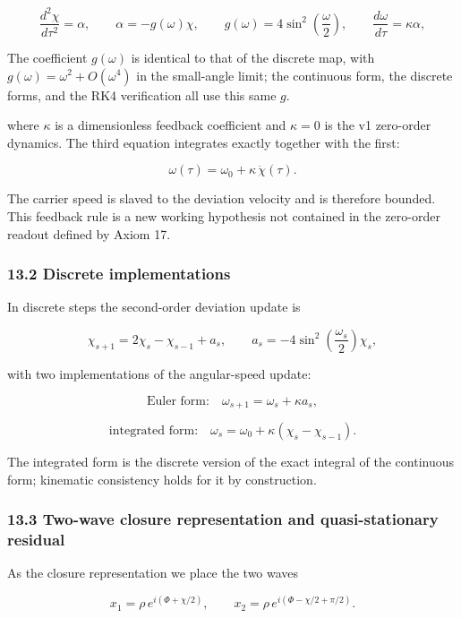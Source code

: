\documentclass[
  a4paper,
]{article}
\begin{document}
\[
\frac{d^2\chi}{d\tau^2}=\alpha,
\qquad
\alpha=-g(\omega)\chi,
\qquad
g(\omega)=4\sin^2\!\left(\frac{\omega}{2}\right),
\qquad
\frac{d\omega}{d\tau}=\kappa\alpha,
\]

The coefficient \(g(\omega)\) is identical to that of the discrete map,
with \(g(\omega)=\omega^2+O(\omega^4)\) in the small-angle limit; the
continuous form, the discrete forms, and the RK4 verification all use
this same \(g\).

where \(\kappa\) is a dimensionless feedback coefficient and
\(\kappa=0\) is the v1 zero-order dynamics. The third equation
integrates exactly together with the first:

\[
\boxed{
\omega(\tau)=\omega_0+\kappa\,\dot\chi(\tau).
}
\]

The carrier speed is slaved to the deviation velocity and is therefore
bounded. This feedback rule is a new working hypothesis not contained in
the zero-order readout defined by Axiom 17.

\subsubsection{13.2 Discrete
implementations}\label{discrete-implementations}

In discrete steps the second-order deviation update is

\[
\chi_{s+1}=2\chi_s-\chi_{s-1}+a_s,
\qquad
a_s=-4\sin^2\!\left(\frac{\omega_s}{2}\right)\chi_s,
\]

with two implementations of the angular-speed update:

\[
\text{Euler form:}\quad
\omega_{s+1}=\omega_s+\kappa a_s,
\]

\[
\text{integrated form:}\quad
\omega_s=\omega_0+\kappa(\chi_s-\chi_{s-1}).
\]

The integrated form is the discrete version of the exact integral of the
continuous form; kinematic consistency holds for it by construction.

\subsubsection{13.3 Two-wave closure representation and quasi-stationary
residual}\label{two-wave-closure-representation-and-quasi-stationary-residual}

As the closure representation we place the two waves

\[
x_1=\rho\,e^{i(\Phi+\chi/2)},
\qquad
x_2=\rho\,e^{i(\Phi-\chi/2+\pi/2)}.
\]
\end{document}
